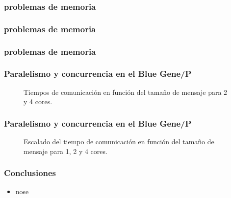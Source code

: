 \documentclass{beamer}
\begin{document}
\begin{frame}
\frametitle{problemas de memoria}

\end{frame}


\begin{frame}
\frametitle{problemas de memoria}

\end{frame}


\begin{frame}
\frametitle{problemas de memoria}
\begin{center}
\end{center}
\end{frame}

\begin{frame}
\frametitle{Paralelismo y concurrencia en el Blue Gene/P}
\begin{figure}
\label{fig:qtoctave-secciones}
  \centering
  \caption{Tiempos de comunicación en función del tamaño de mensaje
    para 2 y 4 cores.}
\end{figure}

\end{frame}


\begin{frame}
\frametitle{Paralelismo y concurrencia en el Blue Gene/P}
\begin{figure}
\label{fig:qtoctave-secciones}
  \centering
  \caption{Escalado del tiempo de comunicación en función del tamaño de mensaje
    para 1, 2 y 4 cores.}
\end{figure}

\end{frame}

\begin{frame}
\frametitle{Conclusiones}
\begin{itemize}
\item nose
\end{itemize}
\end{frame}
\end{document}
